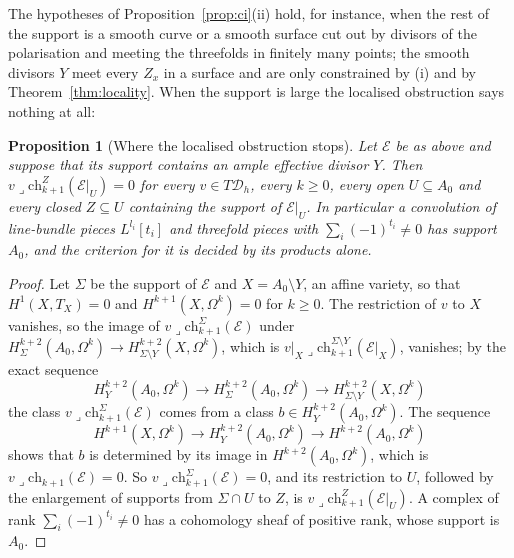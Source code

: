 \documentclass[11pt,reqno]{amsart}
\numberwithin{equation}{section}
\theoremstyle{plain}
\newtheorem{proposition}[theorem]{Proposition}
\theoremstyle{definition}
\newcommand{\ch}{\mathrm{ch}}
\newcommand{\cD}{\mathcal{D}}
\begin{document}
The hypotheses of Proposition~\ref{prop:ci}(ii) hold, for instance, when the rest of the support is a smooth curve or a smooth surface cut out by divisors of the polarisation and meeting the threefolds in finitely many points; the smooth divisors $Y$ meet every $Z_{x}$ in a surface and are only constrained by (i) and by Theorem~\ref{thm:locality}. When the support is large the localised obstruction says nothing at all:

\begin{proposition}[Where the localised obstruction stops]\label{prop:stops}
Let $\mathcal{E}$ be as above and suppose that its support contains an ample effective divisor $Y$. Then $v\lrcorner\ch^{Z}_{k+1}(\mathcal{E}|_{U})=0$ for every $v\in T\cD_{h}$, every $k\ge0$, every open $U\subseteq A_{0}$ and every closed $Z\subseteq U$ containing the support of $\mathcal{E}|_{U}$. In particular a convolution of line-bundle pieces $L^{l_{i}}[t_{i}]$ and threefold pieces with $\sum_{i}(-1)^{t_{i}}\ne0$ has support $A_{0}$, and the criterion for it is decided by its products alone.
\end{proposition}

\begin{proof}
Let $\Sigma$ be the support of $\mathcal{E}$ and $X=A_{0}\setminus Y$, an affine variety, so that $H^{1}(X,T_{X})=0$ and $H^{k+1}(X,\Omega^{k})=0$ for $k\ge0$. The restriction of $v$ to $X$ vanishes, so the image of $v\lrcorner\ch^{\Sigma}_{k+1}(\mathcal{E})$ under $H^{k+2}_{\Sigma}(A_{0},\Omega^{k})\to H^{k+2}_{\Sigma\setminus Y}(X,\Omega^{k})$, which is $v|_{X}\lrcorner\ch^{\Sigma\setminus Y}_{k+1}(\mathcal{E}|_{X})$, vanishes; by the exact sequence
\[
H^{k+2}_{Y}(A_{0},\Omega^{k})\to H^{k+2}_{\Sigma}(A_{0},\Omega^{k})\to H^{k+2}_{\Sigma\setminus Y}(X,\Omega^{k})
\]
the class $v\lrcorner\ch^{\Sigma}_{k+1}(\mathcal{E})$ comes from a class $b\in H^{k+2}_{Y}(A_{0},\Omega^{k})$. The sequence
\[
H^{k+1}(X,\Omega^{k})\to H^{k+2}_{Y}(A_{0},\Omega^{k})\to H^{k+2}(A_{0},\Omega^{k})
\]
shows that $b$ is determined by its image in $H^{k+2}(A_{0},\Omega^{k})$, which is $v\lrcorner\ch_{k+1}(\mathcal{E})=0$. So $v\lrcorner\ch^{\Sigma}_{k+1}(\mathcal{E})=0$, and its restriction to $U$, followed by the enlargement of supports from $\Sigma\cap U$ to $Z$, is $v\lrcorner\ch^{Z}_{k+1}(\mathcal{E}|_{U})$. A complex of rank $\sum_{i}(-1)^{t_{i}}\ne0$ has a cohomology sheaf of positive rank, whose support is $A_{0}$.
\end{proof}
\end{document}
